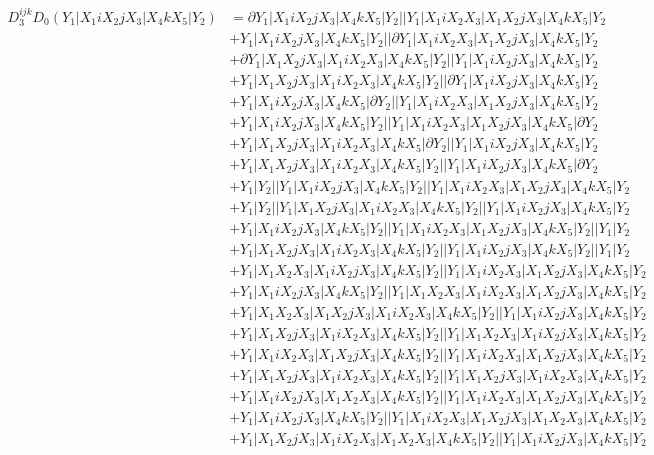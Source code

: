 \documentclass{article}[12pt]
\begin{document}
\begin{align*}
D_3^{ijk}D_0(Y_1|X_1iX_2jX_3|X_4kX_5|Y_2)& =\partial Y_1|X_1iX_2jX_3|X_4kX_5|Y_2||Y_1|X_1iX_2X_3|X_1X_2jX_3|X_4kX_5|Y_2\\ 
 & +Y_1|X_1iX_2jX_3|X_4kX_5|Y_2||\partial Y_1|X_1iX_2X_3|X_1X_2jX_3|X_4kX_5|Y_2\\ 
 & +\partial Y_1|X_1X_2jX_3|X_1iX_2X_3|X_4kX_5|Y_2||Y_1|X_1iX_2jX_3|X_4kX_5|Y_2\\ 
 & +Y_1|X_1X_2jX_3|X_1iX_2X_3|X_4kX_5|Y_2||\partial Y_1|X_1iX_2jX_3|X_4kX_5|Y_2\\ 
 & +Y_1|X_1iX_2jX_3|X_4kX_5|\partial Y_2||Y_1|X_1iX_2X_3|X_1X_2jX_3|X_4kX_5|Y_2\\ 
 & +Y_1|X_1iX_2jX_3|X_4kX_5|Y_2||Y_1|X_1iX_2X_3|X_1X_2jX_3|X_4kX_5|\partial Y_2\\ 
 & +Y_1|X_1X_2jX_3|X_1iX_2X_3|X_4kX_5|\partial Y_2||Y_1|X_1iX_2jX_3|X_4kX_5|Y_2\\ 
 & +Y_1|X_1X_2jX_3|X_1iX_2X_3|X_4kX_5|Y_2||Y_1|X_1iX_2jX_3|X_4kX_5|\partial Y_2\\ 
 & +Y_1|Y_2||Y_1|X_1iX_2jX_3|X_4kX_5|Y_2||Y_1|X_1iX_2X_3|X_1X_2jX_3|X_4kX_5|Y_2\\ 
 & +Y_1|Y_2||Y_1|X_1X_2jX_3|X_1iX_2X_3|X_4kX_5|Y_2||Y_1|X_1iX_2jX_3|X_4kX_5|Y_2\\ 
 & +Y_1|X_1iX_2jX_3|X_4kX_5|Y_2||Y_1|X_1iX_2X_3|X_1X_2jX_3|X_4kX_5|Y_2||Y_1|Y_2\\ 
 & +Y_1|X_1X_2jX_3|X_1iX_2X_3|X_4kX_5|Y_2||Y_1|X_1iX_2jX_3|X_4kX_5|Y_2||Y_1|Y_2\\ 
 & +Y_1|X_1X_2X_3|X_1iX_2jX_3|X_4kX_5|Y_2||Y_1|X_1iX_2X_3|X_1X_2jX_3|X_4kX_5|Y_2\\ 
 & +Y_1|X_1iX_2jX_3|X_4kX_5|Y_2||Y_1|X_1X_2X_3|X_1iX_2X_3|X_1X_2jX_3|X_4kX_5|Y_2\\ 
 & +Y_1|X_1X_2X_3|X_1X_2jX_3|X_1iX_2X_3|X_4kX_5|Y_2||Y_1|X_1iX_2jX_3|X_4kX_5|Y_2\\ 
 & +Y_1|X_1X_2jX_3|X_1iX_2X_3|X_4kX_5|Y_2||Y_1|X_1X_2X_3|X_1iX_2jX_3|X_4kX_5|Y_2\\ 
 & +Y_1|X_1iX_2X_3|X_1X_2jX_3|X_4kX_5|Y_2||Y_1|X_1iX_2X_3|X_1X_2jX_3|X_4kX_5|Y_2\\ 
 & +Y_1|X_1X_2jX_3|X_1iX_2X_3|X_4kX_5|Y_2||Y_1|X_1X_2jX_3|X_1iX_2X_3|X_4kX_5|Y_2\\ 
 & +Y_1|X_1iX_2jX_3|X_1X_2X_3|X_4kX_5|Y_2||Y_1|X_1iX_2X_3|X_1X_2jX_3|X_4kX_5|Y_2\\ 
 & +Y_1|X_1iX_2jX_3|X_4kX_5|Y_2||Y_1|X_1iX_2X_3|X_1X_2jX_3|X_1X_2X_3|X_4kX_5|Y_2\\ 
 & +Y_1|X_1X_2jX_3|X_1iX_2X_3|X_1X_2X_3|X_4kX_5|Y_2||Y_1|X_1iX_2jX_3|X_4kX_5|Y_2\\ 

\end{align*}
\end{document}
